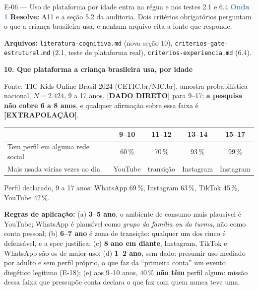 \documentclass[11pt,a4paper]{article}
\newcommand{\onda}[1]{\textcolor{SteelBlue}{\textbf{Onda #1}}}
\newcommand{\dado}{\textbf{[DADO DIRETO]}}
\newcommand{\extrap}{\textbf{[EXTRAPOLAÇÃO]}}
\begin{document}
\begin{emendabox}{E-06 --- Uso de plataforma por idade entra na régua e nos testes 2.1 e 6.4 \hfill \onda{1}}
\textbf{Resolve:} A11 e a seção 5.2 da auditoria. Dois critérios obrigatórios perguntam o que a
criança brasileira usa, e nenhum arquivo cita a fonte que responde.

\textbf{Arquivos:} \texttt{literatura-cognitiva.md} (nova seção 10),
\texttt{criterios-gate-estrutural.md} (2.1, teste de plataforma real),
\texttt{criterios-experiencia.md} (6.4).

\begin{depoisbox}\small
\textbf{10. Que plataforma a criança brasileira usa, por idade}

Fonte: TIC Kids Online Brasil 2024 (CETIC.br/NIC.br), amostra probabilística nacional,
$N = 2.424$, 9 a 17 anos. \dado{} para 9--17; \textbf{a pesquisa não cobre 6 a 8 anos}, e
qualquer afirmação sobre essa faixa é \extrap{}.

\begin{center}
\begin{tabular}{@{}l c c c c@{}}
\toprule
& 9--10 & 11--12 & 13--14 & 15--17 \\
\midrule
Tem perfil em alguma rede social & 60\,\% & 70\,\% & 93\,\% & 99\,\% \\
Mais usada várias vezes ao dia & YouTube & transição & Instagram & Instagram \\
\bottomrule
\end{tabular}
\end{center}

Perfil declarado, 9 a 17 anos: WhatsApp 69\,\%, Instagram 63\,\%, TikTok 45\,\%, YouTube 42\,\%.

\textbf{Regras de aplicação:} (a) \textbf{3\textordmasculine{}--5\textordmasculine{} ano}, o
ambiente de consumo mais plausível é YouTube; WhatsApp é plausível como \emph{grupo da família ou
da turma}, não como conta pessoal; (b) \textbf{6\textordmasculine{}--7\textordmasculine{} ano} é
zona de transição: qualquer um dos cinco é defensável, e a spec justifica; (c)
\textbf{8\textordmasculine{} ano em diante}, Instagram, TikTok e WhatsApp são os de maior uso; (d)
\textbf{1\textordmasculine{}--2\textordmasculine{} ano}, sem dado: presumir uso mediado por adulto
e sem perfil próprio, o que faz da ``primeira conta'' um evento diegético legítimo (E-18); (e) aos
9--10 anos, 40\,\% \textbf{não têm} perfil algum: missão dessa faixa que pressupõe conta declara o
que faz com quem nunca teve uma.
\end{depoisbox}


\end{emendabox}
\end{document}
